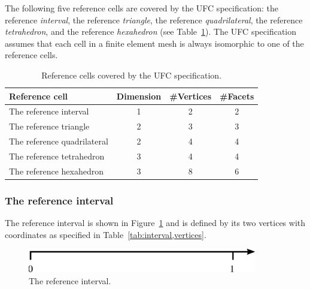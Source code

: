 
The following five reference cells are covered by the UFC specification:
the reference \emph{interval},
the reference \emph{triangle},
the reference \emph{quadrilateral},
the reference \emph{tetrahedron}, and
the reference \emph{hexahedron} (see Table~\ref{tab:ufc_reference_cells}).
The UFC specification assumes that each cell in a finite element mesh
is always isomorphic to one of the reference cells.

\begin{table}
\linespread{1.2}\selectfont
  \begin{center}
    \begin{tabular}{|l|c|c|c|}
      \hline
      Reference cell & Dimension & \#Vertices & \#Facets \\
      \hline
      \hline
      The reference interval      & 1 & 2 & 2 \\
      \hline
      The reference triangle      & 2 & 3 & 3 \\
      \hline
      The reference quadrilateral & 2 & 4 & 4 \\
      \hline
      The reference tetrahedron   & 3 & 4 & 4 \\
      \hline
      The reference hexahedron    & 3 & 8 & 6 \\
      \hline
    \end{tabular}
    \caption{Reference cells covered by the UFC specification.}
    \label{tab:ufc_reference_cells}
  \end{center}
\end{table}

\subsubsection{The reference interval}

The reference interval is shown in Figure~\ref{fig:interval} and is
defined by its two vertices with coordinates as specified in
Table~\ref{tab:interval,vertices}.

\begin{figure}
  \begin{center}
    \includegraphics[width=10cm]{chapters/alnes-2/eps/interval.eps}
    \caption{The reference interval.}
    \label{fig:interval}
  \end{center}
\end{figure}

